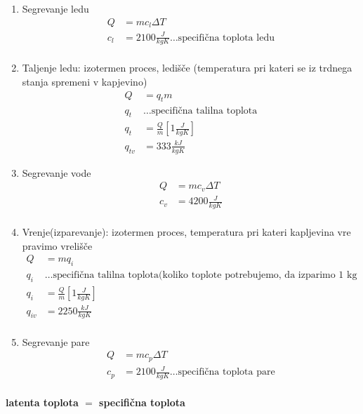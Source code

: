 \begin{enumerate}
	\item Segrevanje ledu\\
	\begin{align*}
		Q &= m c_l \Delta T\\
		c_l &= 2100 \frac{J}{kgK}\dots \text{specifična toplota ledu}\\
	\end{align*}
	\item Taljenje ledu: izotermen proces, ledišče (temperatura pri kateri se iz trdnega stanja spremeni v kapjevino)\\
	\begin{align*}
		Q &= q_t m\\
		q_t &\dots \text{specifična talilna toplota}\\
		q_t &= \frac{Q}{m}[1\frac{J}{kgK}]\\
		q_{tv} &= 333 \frac{kJ}{kgK}
	\end{align*}
	\item Segrevanje vode
	\begin{align*}
		Q &= m c_v \Delta T\\
		c_v &= 4200 \frac{J}{kgK}\\
	\end{align*}
	\item Vrenje(izparevanje): izotermen proces, temperatura pri kateri kapljevina vre pravimo vrelišče
	\begin{align*}
		Q &= m q_i\\
		q_i &\dots \text{specifična talilna toplota(koliko toplote potrebujemo, da izparimo 1 kg snovi)}\\
		q_i &= \frac{Q}{m}[1\frac{J}{kgK}]\\
		q_{iv} &= 2250 \frac{kJ}{kgK}\\
	\end{align*}
	\item Segrevanje pare
	\begin{align*}
		Q &= m c_p \Delta T\\
		c_p &= 2100 \frac{J}{kgK}\dots \text{specifična toplota pare}\\
	\end{align*}
\end{enumerate}
\textbf{latenta toplota $=$ specifična toplota}

